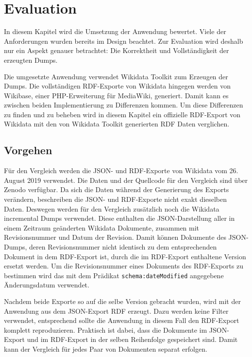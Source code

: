 \chapter{Evaluation}
\label{chap:evaluation}
In diesem Kapitel wird die Umsetzung der Anwendung bewertet.
Viele der Anforderungen wurden bereits im Design beachtet.
Zur Evaluation wird deshalb nur ein Aspekt genauer betrachtet: Die Korrektheit und Vollständigkeit der erzeugten Dumps.

Die umgesetzte Anwendung verwendet Wikidata Toolkit zum Erzeugen der Dumps.
Die vollständigen RDF-Exporte von Wikidata hingegen werden von Wikibase, einer PHP-Erweiterung für MediaWiki, generiert.
Damit kann es zwischen beiden Implementierung zu Differenzen kommen.
Um diese Differenzen zu finden und zu beheben wird in diesem Kapitel ein offizielle RDF-Export von Wikidata mit den von Wikidata Toolkit generierten RDF Daten verglichen. 

\section{Vorgehen}
Für den Vergleich werden die JSON- und RDF-Exporte von Wikidata vom 26. August 2019 verwendet.
Die Daten und der Quellcode für den Vergleich sind über Zenodo verfügbar\cite{zenodo-diff-data}.
Da sich die Daten während der Generierung des Exports verändern, beschreiben die JSON- und RDF-Exporte nicht exakt dieselben Daten.
Deswegen werden für den Vergleich zusätzlich noch die Wikidata incremental Dumps verwendet.
Diese enthalten die JSON-Darstellung aller in einem Zeitraum geänderten Wikidata Dokumente, zusammen mit Revisionsnummer und Datum der Revision. 
Damit können Dokumente des JSON-Dumps, deren Revisionsnummer nicht identisch zu dem entsprechenden Dokument in dem RDF-Export ist, durch die im RDF-Export enthaltene Version ersetzt werden.
Um die Revisionsnummer eines Dokuments des RDF-Exports zu bestimmen wird das mit dem Prädikat \verb|schema:dateModified| angegebene Änderungsdatum verwendet.

Nachdem beide Exporte so auf die selbe Version gebracht wurden, wird mit der Anwendung aus dem JSON-Export RDF erzeugt.
Dazu werden keine Filter verwendet, entsprechend sollte die Anwendung in diesem Fall den RDF-Export komplett reproduzieren.
Praktisch ist dabei, dass die Dokumente im JSON-Export und im RDF-Export in der selben Reihenfolge gespeichert sind.
Damit kann der Vergleich für jedes Paar von Dokumenten separat erfolgen.

